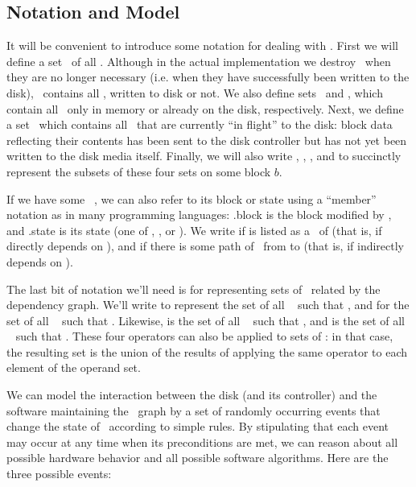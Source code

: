 \subsection{Notation and Model}
\label{sec:chdescs:notation}

It will be convenient to introduce some notation for dealing with \chdescs.
First we will define a set \ChAll\ of all \chdescs. Although in the actual
implementation we destroy \chdescs\ when they are no longer necessary (i.e. when
they have successfully been written to the disk), \ChAll\ contains all \chdescs,
written to disk or not. We also define sets \ChMem\ and \ChDisk, which contain
all \chdescs\ only in memory or already on the disk, respectively. Next, we
define a set \ChInf\ which contains all \chdescs\ that are currently ``in
flight'' to the disk: block data reflecting their contents has been sent to the
disk controller but has not yet been written to the disk media itself. Finally,
we will also write , , , and  to
succinctly represent the subsets of these four sets on some block $b$.

If we have some \chdesc\ , we can also refer to its block or state using a
``member'' notation as in many programming languages: .block is the block
modified by , and .state is its state (one of \statenone, \stateinf,
or \statedisk). We write  if  is listed as a \before\
of  (that is, if  directly depends on ), and
 if there is some path of \befores\ from  to
\p{q} (that is, if \p{p} indirectly depends on ).

The last bit of notation we'll need is for representing sets of \chdescs\
related by the dependency graph. We'll write  to represent the set of
all \chdescs\  such that \depends{p}{q}, and \BeforeS{p} for the set of all
\chdescs\  such that \indirdepends{p}{q}. Likewise, \After{p} is the set of
all \chdescs\ \p{q} such that \depends{q}{p}, and \AfterS{p} is the set of all
\chdescs\ \p{q} such that \indirdepends{q}{p}. These four operators can also be
applied to sets of \chdescs: in that case, the resulting set is the union of the
results of applying the same operator to each element of the operand set.

We can model the interaction between the disk (and its controller) and the
software maintaining the \chdesc\ graph by a set of randomly occurring events
that change the state of \chdescs\ according to simple rules. By stipulating
that each event may occur at any time when its preconditions are met, we can
reason about all possible hardware behavior and all possible software
algorithms. Here are the three possible events:

